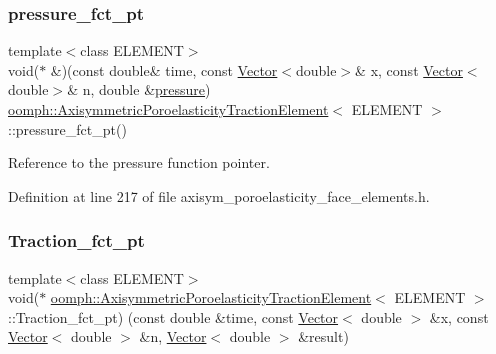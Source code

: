 \subsubsection{\texorpdfstring{pressure\+\_\+fct\+\_\+pt}{pressure\_fct\_pt}}
{\footnotesize\ttfamily template$<$class E\+L\+E\+M\+E\+NT$>$ \\
void($\ast$ \&)(const double\& time, const \hyperlink{classoomph_1_1Vector}{Vector}$<$double$>$\& x, const \hyperlink{classoomph_1_1Vector}{Vector}$<$double$>$\& n, double \&\hyperlink{classoomph_1_1AxisymmetricPoroelasticityTractionElement_a9d0a69336be18e1a62450c5c8872777b}{pressure}) \hyperlink{classoomph_1_1AxisymmetricPoroelasticityTractionElement}{oomph\+::\+Axisymmetric\+Poroelasticity\+Traction\+Element}$<$ E\+L\+E\+M\+E\+NT $>$\+::pressure\+\_\+fct\+\_\+pt()\hspace{0.3cm}{\ttfamily [inline]}}



Reference to the pressure function pointer. 



Definition at line 217 of file axisym\+\_\+poroelasticity\+\_\+face\+\_\+elements.\+h.

\mbox{\label{classoomph_1_1AxisymmetricPoroelasticityTractionElement_a60243c82b6016fdeaa118c348b007c13}} 
\subsubsection{\texorpdfstring{Traction\+\_\+fct\+\_\+pt}{Traction\_fct\_pt}}
{\footnotesize\ttfamily template$<$class E\+L\+E\+M\+E\+NT$>$ \\
void($\ast$ \hyperlink{classoomph_1_1AxisymmetricPoroelasticityTractionElement}{oomph\+::\+Axisymmetric\+Poroelasticity\+Traction\+Element}$<$ E\+L\+E\+M\+E\+NT $>$\+::Traction\+\_\+fct\+\_\+pt) (const double \&time, const \hyperlink{classoomph_1_1Vector}{Vector}$<$ double $>$ \&x, const \hyperlink{classoomph_1_1Vector}{Vector}$<$ double $>$ \&n, \hyperlink{classoomph_1_1Vector}{Vector}$<$ double $>$ \&result)\hspace{0.3cm}{\ttfamily [protected]}}




